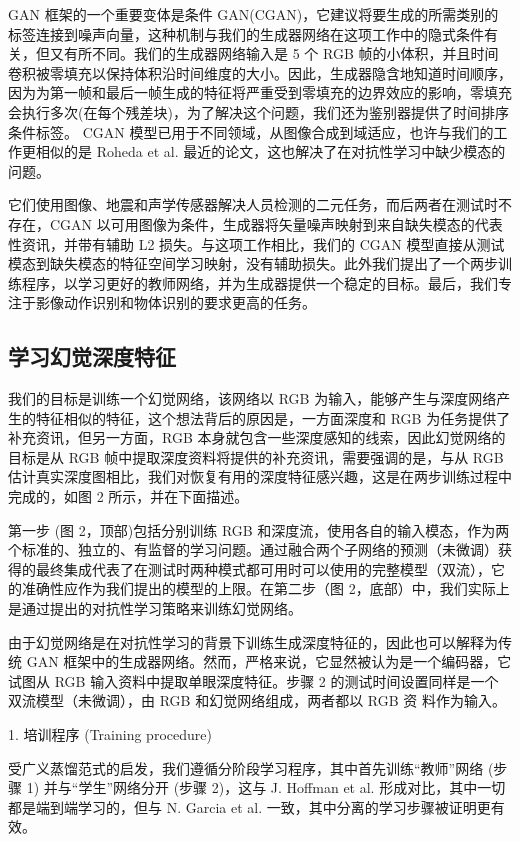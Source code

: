 GAN 框架的一个重要变体是条件 GAN(CGAN)，它建议将要生成的所需类别的标签连接到噪声向量，这种机制与我们的生成器网络在这项工作中的隐式条件有关，但又有所不同。我们的生成器网络输入是 5 个 RGB 帧的小体积，并且时间卷积被零填充以保持体积沿时间维度的大小。因此，生成器隐含地知道时间顺序，因为为第一帧和最后一帧生成的特征将严重受到零填充的边界效应的影响，零填充会执行多次(在每个残差块)，为了解决这个问题，我们还为鉴别器提供了时间排序条件标签。 CGAN 模型已用于不同领域，从图像合成到域适应，也许与我们的工作更相似的是 Roheda et al. 最近的论文，这也解决了在对抗性学习中缺少模态的问题。

它们使用图像、地震和声学传感器解决人员检测的二元任务，而后两者在测试时不存在，CGAN 以可用图像为条件，生成器将矢量噪声映射到来自缺失模态的代表性资讯，并带有辅助 L2 损失。与这项工作相比，我们的 CGAN 模型直接从测试模态到缺失模态的特征空间学习映射，没有辅助损失。此外我们提出了一个两步训练程序，以学习更好的教师网络，并为生成器提供一个稳定的目标。最后，我们专注于影像动作识别和物体识别的要求更高的任务。

\subsection{学习幻觉深度特征}

我们的目标是训练一个幻觉网络，该网络以 RGB 为输入，能够产生与深度网络产生的特征相似的特征，这个想法背后的原因是，一方面深度和 RGB 为任务提供了补充资讯，但另一方面，RGB 本身就包含一些深度感知的线索，因此幻觉网络的目标是从 RGB 帧中提取深度资料将提供的补充资讯，需要强调的是，与从 RGB 估计真实深度图相比，我们对恢复有用的深度特征感兴趣，这是在两步训练过程中完成的，如图 2 所示，并在下面描述。

第一步 (图 2，顶部)包括分别训练 RGB 和深度流，使用各自的输入模态，作为两个标准的、独立的、有监督的学习问题。通过融合两个子网络的预测（未微调）获得的最终集成代表了在测试时两种模式都可用时可以使用的完整模型（双流），它的准确性应作为我们提出的模型的上限。在第二步（图 2，底部）中，我们实际上是通过提出的对抗性学习策略来训练幻觉网络。

由于幻觉网络是在对抗性学习的背景下训练生成深度特征的，因此也可以解释为传统 GAN 框架中的生成器网络。然而，严格来说，它显然被认为是一个编码器，它试图从 RGB 输入资料中提取单眼深度特征。步骤 2 的测试时间设置同样是一个双流模型（未微调），由 RGB 和幻觉网络组成，两者都以 RGB 资
料作为输入。

1. 培训程序 (Training procedure) 

受广义蒸馏范式的启发，我们遵循分阶段学习程序，其中首先训练“教师”网络 (步骤 1) 并与“学生”网络分开 (步骤 2)，这与  J. Hoffman et al. 形成对比，其中一切都是端到端学习的，但与 N. Garcia et al. 一致，其中分离的学习步骤被证明更有效。

